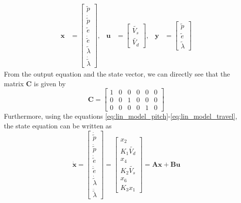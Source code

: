 \begin{align}\label{eq:states_part4}
    \textbf{x} &= \begin{bmatrix} \tilde{p} \\ \dot{\tilde{p}} \\ \tilde{e} \\ \dot{\tilde{e}} \\ \tilde{\lambda} \\ \dot{\tilde{\lambda}} \end{bmatrix}, &\textbf{u} &= \begin{bmatrix} \tilde{V_{s}} \\ \tilde{V_{d}} \end{bmatrix}, &\mathbf{y} &= \begin{bmatrix} \tilde{p} \\ \tilde{e} \\ \tilde{\lambda} \end{bmatrix}
\end{align}
From the output equation and the state vector, we can directly see that the matrix \textbf{C} is given by 
\begin{equation}
    \mathbf{C} = 
    \begin{bmatrix}
    1 & 0 & 0 & 0 & 0 & 0 \\
    0 & 0 & 1 & 0 & 0 & 0 \\
    0 & 0 & 0 & 0 & 1 & 0
    \end{bmatrix}
\end{equation}
Furthermore, using the equations \eqref{eq:lin_model_pitch}-\eqref{eq:lin_model_travel}, the state equation can be written as
\begin{equation}\nonumber
    \mathbf{\dot{x}} = 
    \begin{bmatrix} 
        \dot{\tilde{p}} \\ 
        \ddot{\tilde{p}} \\ 
        \dot{\tilde{e}} \\ 
        \ddot{\tilde{e}} \\ 
        \dot{\tilde{\lambda}}\\ 
        \ddot{\tilde{\lambda}} 
    \end{bmatrix} = 
    \begin{bmatrix} 
        x_{2}\\ 
        K_1\tilde{V_d}\\ 
        x_4\\ 
        K_2\tilde{V_s}\\ 
        x_6\\ 
        K_3 x_1 
    \end{bmatrix} = \mathbf{Ax + Bu}
\end{equation}
